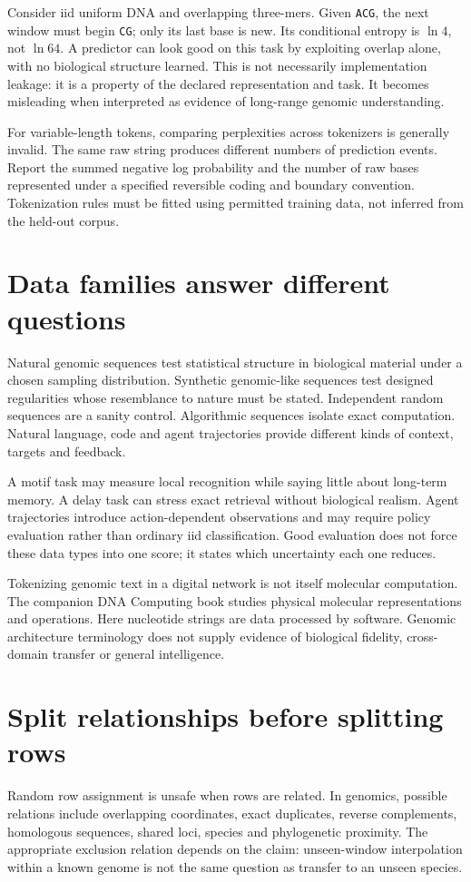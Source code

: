 Consider iid uniform DNA and overlapping three-mers. Given \texttt{ACG}, the next window must begin \texttt{CG}; only its last base is new. Its conditional entropy is $\ln4$, not $\ln64$. A predictor can look good on this task by exploiting overlap alone, with no biological structure learned. This is not necessarily implementation leakage: it is a property of the declared representation and task. It becomes misleading when interpreted as evidence of long-range genomic understanding.

For variable-length tokens, comparing perplexities across tokenizers is generally invalid. The same raw string produces different numbers of prediction events. Report the summed negative log probability and the number of raw bases represented under a specified reversible coding and boundary convention. Tokenization rules must be fitted using permitted training data, not inferred from the held-out corpus.

\section{Data families answer different questions}
Natural genomic sequences test statistical structure in biological material under a chosen sampling distribution. Synthetic genomic-like sequences test designed regularities whose resemblance to nature must be stated. Independent random sequences are a sanity control. Algorithmic sequences isolate exact computation. Natural language, code and agent trajectories provide different kinds of context, targets and feedback.

A motif task may measure local recognition while saying little about long-term memory. A delay task can stress exact retrieval without biological realism. Agent trajectories introduce action-dependent observations and may require policy evaluation rather than ordinary iid classification. Good evaluation does not force these data types into one score; it states which uncertainty each one reduces.

Tokenizing genomic text in a digital network is not itself molecular computation. The companion DNA Computing book studies physical molecular representations and operations. Here nucleotide strings are data processed by software. Genomic architecture terminology does not supply evidence of biological fidelity, cross-domain transfer or general intelligence.

\section{Split relationships before splitting rows}
Random row assignment is unsafe when rows are related. In genomics, possible relations include overlapping coordinates, exact duplicates, reverse complements, homologous sequences, shared loci, species and phylogenetic proximity. The appropriate exclusion relation depends on the claim: unseen-window interpolation within a known genome is not the same question as transfer to an unseen species.

